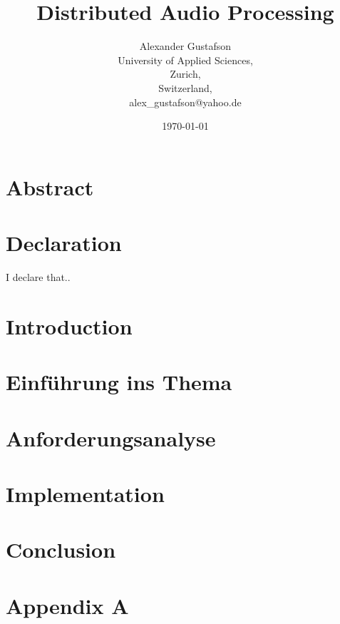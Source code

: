 \documentclass{report}
\begin{document}
\title{Distributed Audio Processing}
\author{Alexander Gustafson\\
  University of Applied Sciences,\\
  Zurich,\\
  Switzerland,\\
  alex\_gustafson@yahoo.de}
\date{\today}
\maketitle

\chapter*{Abstract}


\chapter*{Declaration}
I declare that..

\tableofcontents

\chapter{Introduction}



\chapter{Einführung ins Thema}


\chapter{Anforderungsanalyse}


\chapter{Implementation}


\chapter{Conclusion}


{}


\chapter{Appendix A}


\end{document}
